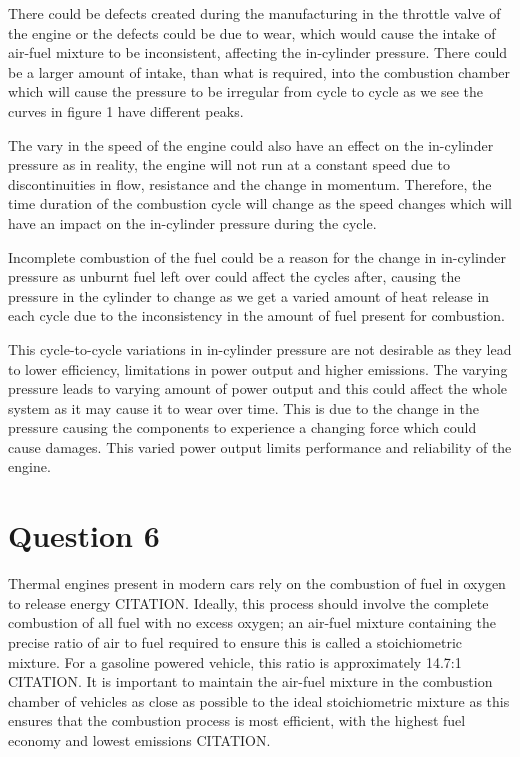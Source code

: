 \documentclass[11pt]{article}
\begin{document}
There could be defects created during the manufacturing in the throttle valve of the engine or the defects could be due to wear, which would cause the intake of air-fuel mixture to be inconsistent, affecting the in-cylinder pressure. There could be a larger amount of intake, than what is required, into the combustion chamber which will cause the pressure to be irregular from cycle to cycle as we see the curves in figure 1 have different peaks. 

The vary in the speed of the engine could also have an effect on the in-cylinder pressure as in reality, the engine will not run at a constant speed due to discontinuities in flow, resistance and the change in momentum. Therefore, the time duration of the combustion cycle will change as the speed changes which will have an impact on the in-cylinder pressure during the cycle.  

Incomplete combustion of the fuel could be a reason for the change in in-cylinder pressure as unburnt fuel left over could affect the cycles after, causing the pressure in the cylinder to change as we get a varied amount of heat release in each cycle due to the inconsistency in the amount of fuel present for combustion. 

This cycle-to-cycle variations in in-cylinder pressure are not desirable as they lead to lower efficiency, limitations in power output and higher emissions. The varying pressure leads to varying amount of power output and this could affect the whole system as it may cause it to wear over time. This is due to the change in the pressure causing the components to experience a changing force which could cause damages. This varied power output limits performance and reliability of the engine.  
\section*{Question 6}
Thermal engines present in modern cars rely on the combustion of fuel in oxygen to release energy CITATION. Ideally, this process should involve the complete combustion of all fuel with no excess oxygen; an air-fuel mixture containing the precise ratio of air to fuel required to ensure this is called a stoichiometric mixture. For a gasoline powered vehicle, this ratio is approximately 14.7:1 CITATION. It is important to maintain the air-fuel mixture in the combustion chamber of vehicles as close as possible to the ideal stoichiometric mixture as this ensures that the combustion process is most efficient, with the highest fuel economy and lowest emissions CITATION.
\end{document}

